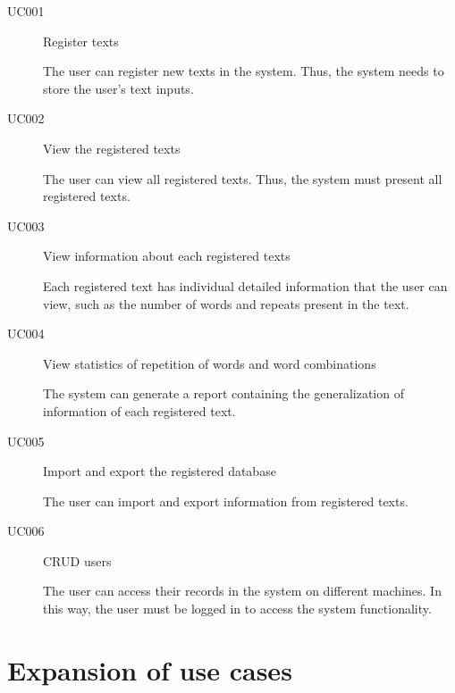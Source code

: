 \documentclass[11pt, twoside, a4paper]{book}
\begin{document}
			\begin{description}
				\item[UC001] Register texts
					
					The user can register new texts in the system. Thus, the system needs to store the user's text inputs.

				\item[UC002] View the registered texts
					
					The user can view all registered texts. Thus, the system must present all registered texts.

				\item[UC003] View information about each registered texts
					
					Each registered text has individual detailed information that the user can view, such as the number of words and repeats present in the text.
					
				\item[UC004] View statistics of repetition of words and word combinations
					
					The system can generate a report containing the generalization of information of each registered text.
					
				\item[UC005] Import and export the registered database
					
					The user can import and export information from registered texts.
					
				\item[UC006] CRUD users
					
					The user can access their records in the system on different machines. In this way, the user must be logged in to access the system functionality.
					
			\end{description}

		\section{Expansion of use cases}
			
\end{document}
